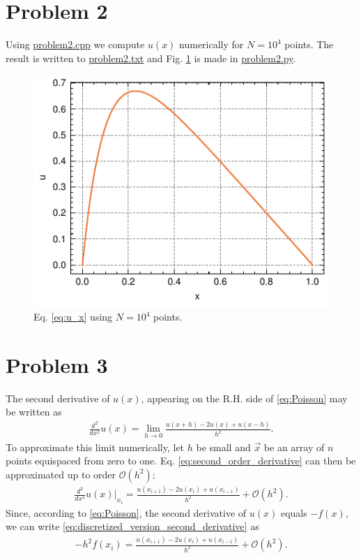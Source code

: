 \documentclass[english,notitlepage,reprint,nofootinbib]{revtex4-2}  %
\begin{document}
\section{Problem 2}
Using \href{https://github.com/isakrukan/FYS4150/blob/main/Project1/Code/problem2.cpp}{problem2.cpp} we compute $u(x)$ numerically for $N=10^4$ points. The result is written to \href{https://github.com/isakrukan/FYS4150/blob/main/Project1/Code/problem2.txt}{problem2.txt} and Fig. \ref{fig:u_x} is made in \href{https://github.com/isakrukan/FYS4150/blob/main/Project1/Code/problem2.py}{problem2.py}.
\begin{figure}[h!]
    \centering
    \includegraphics{Figs/problem2.pdf}
    \caption{Eq. \eqref{eq:u_x} using $N=10^4$ points.}
    \label{fig:u_x}
\end{figure}

\section{Problem 3}
The second derivative of $u(x)$, appearing on the R.H. side of \eqref{eq:Poisson} may be written as
\begin{align}
    \frac{d^2}{dx^2}u(x) = \lim_{h\rightarrow 0} \frac{u(x+h) -2u(x) + u(x-h)}{h^2}.    \label{eq:second_order_derivative}
\end{align}
To approximate this limit numerically, let $h$ be small and $\vec{x}$ be an array of $n$ points equispaced from zero to one. Eq. \eqref{eq:second_order_derivative} can then be approximated up to order $\mathcal{O}(h^2)$:
\begin{align}
    \frac{d^2}{dx^2}u(x)\vert_{x_i} = \frac{u(x_{i+1}) - 2u(x_i) + u(x_{i-1})}{h^2} + \mathcal{O}(h^2).  \label{eq:discretized_version_second_derivative}
\end{align}   
Since, according to \eqref{eq:Poisson}, the second derivative of $u(x)$ equals $-f(x)$, we can write \eqref{eq:discretized_version_second_derivative} as  
\begin{align}
    -h^2f(x_i) = \frac{u(x_{i+1}) - 2u(x_i) + u(x_{i-1})}{h^2} + \mathcal{O}(h^2). \label{eq:Poisson_disc}
\end{align}
\end{document}
